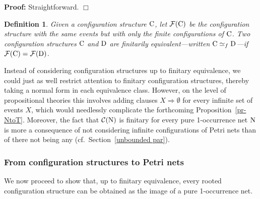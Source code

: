\documentclass[twocolumn]{article}
\newcommand{\out}[1]{}        \newcommand{\ams}[1]{#1}      \usepackage[preserveurlmacro]{breakurl}
\newtheorem{defi}{Definition}[section]
\newtheorem{prop}{Proposition}[section]
\newenvironment{definition}[1]{\begin{defi} \rm \label{df-#1} }{\end{defi}}
\newenvironment{proposition}[1]{\begin{prop} \rm \label{pr-#1} }{\end{prop}}
\newenvironment{proof}{\begin{trivlist} \item[\hspace{\labelsep}\bf
Proof:]}{\hfill $\Box$\end{trivlist}}
\newcommand{\pr}[1]{Proposition~\ref{pr-#1}}
\newcommand{\phrase}[1]{\index{#1}{\em #1}}		\newcommand{\implies}{\Rightarrow}
\newcommand{\turn}{\vdash}                              \newcommand{\dbigcup}{\bigcup_{\uparrow}}		\newcommand{\nbigcup}{\bigcup_{\bullet}}		\newcommand{\nbigcap}{\bigcap_{\bullet}}		\newcommand{\bbigcup}{\overline{\bigcup}}		\newcommand{\bbigcap}{\overline{\bigcap}}		\newcommand{\nbbigcap}{\bbigcap_{\bullet}}		\newcommand{\fbbigcup}{\overline{\bigcup}^f}		\newcommand{\bbbigcup}{\overline{\bigcup}^2}		\newcommand{\dcup}{~~\makebox[0pt]{\LARGE$\cdot$}\makebox[0pt]{$\cup$}~~}
\begin{document}
\begin{proof}
Straightforward.
\end{proof}

\begin{definition}{finitary equivalence}
Given a configuration structure ${\rm C}$, let ${\cal F}({\rm C})$ be the
configuration structure with the same events but with only the finite
configurations of ${\rm C}$.
Two configuration structures ${\rm C}$ and ${\rm D}$ are \emph{finitarily
equivalent}---written ${\rm C} \simeq_f {\rm D}$---if
${\cal F}({\rm C}) = {\cal F}({\rm D})$. 
\end{definition}
Instead of considering configuration structures up to finitary
equivalence, we could just as well restrict attention to finitary
configuration structures, thereby taking a normal form in each
equivalence class.  However, on the level of propositional theories
this involves adding clauses $X\implies\emptyset$ for every infinite
set of events $X$, which would needlessly complicate the forthcoming
\pr{NtoT}.  Moreover, the fact that ${\cal C}({\rm N})$ is finitary for every
pure 1-occurrence net ${\rm N}$ is more a consequence of not considering
infinite configurations of Petri nets than of there not being any
(cf.\ Section~\ref{unbounded par}).

\out{
 A configuration structure is \phrase{finitary} if all its configurations
 are finite.  A propositional theory is \phrase{finitary} if, for every
 infinite $X \subseteq E$, it has the clause $X \implies \emptyset$ as
 a logical consequence.  An event structure $\tuple{E,\turn\;}$ is \phrase{
 finitary} if $X \turn Y$ only holds for finite sets $Y$.

 \begin{proposition}{finitary}
 If C is finitary, then so are $\fT(\eC)$ and $\fE(\eC)$.
 If T is finitary, then so are $\fM(\eT)$ and $\fE(\eT)$.
 If E is finitary, then so are $\fL(\eE)$ and $\fT(\eE)$.
 \end{proposition}

 \begin{proof}
 Straightforward.
 \end{proof}
}

\subsubsection*{From configuration structures to Petri nets}

We now proceed to show that, up to finitary equivalence, every rooted
configuration structure can be obtained as the image of a pure
1-occurrence net.
\end{document}
